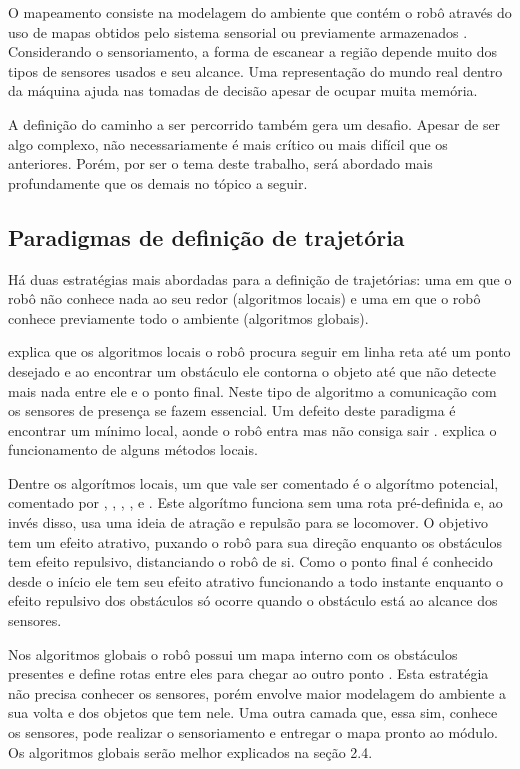 O mapeamento consiste na modelagem do ambiente que contém o robô através do uso de mapas obtidos pelo sistema sensorial ou previamente armazenados \cite{Souza2008}. Considerando o sensoriamento, a forma de escanear a região depende muito dos tipos de sensores usados e seu alcance. Uma representação do mundo real dentro da máquina ajuda nas tomadas de decisão apesar de ocupar muita memória.

A definição do caminho a ser percorrido também gera um desafio. Apesar de ser algo complexo, não necessariamente é mais crítico ou mais difícil que os anteriores. Porém, por ser o tema deste trabalho, será abordado mais profundamente que os demais no tópico a seguir.

\subsection{Paradigmas de definição de trajetória}

Há duas estratégias mais abordadas para a definição de trajetórias: uma em que o robô não conhece nada ao seu redor (algoritmos locais) e uma em que o robô conhece previamente todo o ambiente (algoritmos globais).

\cite{Guzman2008} explica que os algoritmos locais o robô procura seguir em linha reta até um ponto desejado e ao encontrar um obstáculo ele contorna o objeto até que não detecte mais nada entre ele e o ponto final. Neste tipo de algoritmo a comunicação com os sensores de presença se fazem essencial. Um defeito deste paradigma é encontrar um mínimo local, aonde o robô entra mas não consiga sair \cite{Souza2008}. \cite{Secchi2008} explica o funcionamento de alguns métodos locais. 

Dentre os algorítmos locais, um que vale ser comentado é o algorítmo potencial, comentado por \cite{Secchi2008}, \cite{Souza2008}, \cite{Guzman2008}, \cite{Choset2005}, \cite{Siegwart2004} e \cite{Thomsen2010}. Este algorítmo funciona sem uma rota pré-definida e, ao invés disso, usa uma ideia de atração e repulsão para se locomover. O objetivo tem um efeito atrativo, puxando o robô para sua direção enquanto os obstáculos tem efeito repulsivo, distanciando o robô de si. Como o ponto final é conhecido desde o início ele tem seu efeito atrativo funcionando a todo instante enquanto o efeito repulsivo dos obstáculos só ocorre quando o obstáculo está ao alcance dos sensores.

Nos algoritmos globais o robô possui um mapa interno com os obstáculos presentes e define rotas entre eles para chegar ao outro ponto \cite{Guzman2008} \cite{Souza2008}. Esta estratégia não precisa conhecer os sensores, porém envolve maior modelagem do ambiente a sua volta e dos objetos que tem nele. Uma outra camada que, essa sim, conhece os sensores, pode realizar o sensoriamento e entregar o mapa pronto ao módulo. Os algoritmos globais serão melhor explicados na seção 2.4.

